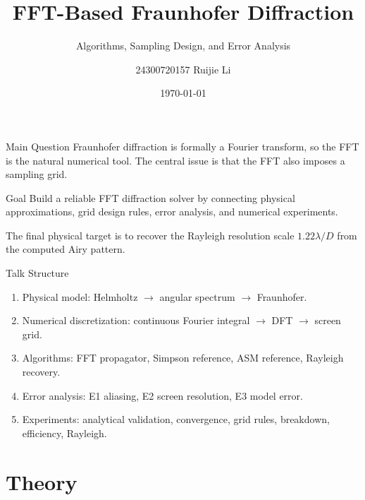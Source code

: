 \documentclass[aspectratio=169,11pt]{beamer}
\title[FFT Diffraction]{FFT-Based Fraunhofer Diffraction}
\subtitle{Algorithms, Sampling Design, and Error Analysis}
\author[Ruijie Li]{24300720157 Ruijie Li}
\institute{}
\date{\today}
\begin{document}
\begin{frame}
    \titlepage
\end{frame}

\begin{frame}{Main Question}
    Fraunhofer diffraction is formally a Fourier transform, so the FFT is the natural numerical tool.
    The central issue is that the FFT also imposes a sampling grid.

    \vspace{0.4cm}
    \begin{block}{Goal}
        Build a reliable FFT diffraction solver by connecting physical approximations, grid design rules,
        error analysis, and numerical experiments.
    \end{block}

    \vspace{0.2cm}
    The final physical target is to recover the Rayleigh resolution scale
    \(1.22\lambda/D\) from the computed Airy pattern.
\end{frame}

\begin{frame}{Talk Structure}
    \begin{enumerate}
        \item Physical model: Helmholtz \(\to\) angular spectrum \(\to\) Fraunhofer.
        \item Numerical discretization: continuous Fourier integral \(\to\) DFT \(\to\) screen grid.
        \item Algorithms: FFT propagator, Simpson reference, ASM reference, Rayleigh recovery.
        \item Error analysis: E1 aliasing, E2 screen resolution, E3 model error.
        \item Experiments: analytical validation, convergence, grid rules, breakdown, efficiency, Rayleigh.
    \end{enumerate}
\end{frame}

\section{Theory}
\end{document}

